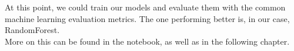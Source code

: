 \begin{table}[H]
    \end{table}
At this point, we could train our models and evaluate them with the common machine learning evaluation metrics. The one performing better is, in our case, RandomForest.\\More on this can be found in the notebook, as well as in the following chapter.

